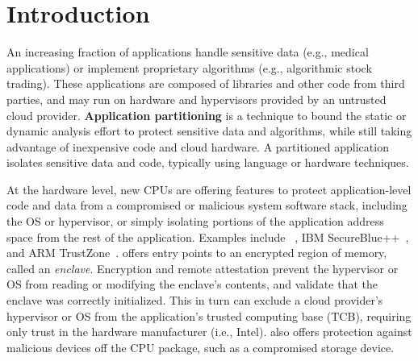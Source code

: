 \section{Introduction}
\label{sec:intro}


An increasing fraction of applications handle sensitive data (e.g., medical applications)
or implement proprietary algorithms (e.g., algorithmic stock trading).
These applications are composed of 
libraries and other code from third parties, and may run on 
hardware and hypervisors provided by an untrusted cloud provider.
{\bf Application partitioning} is a technique to 
bound the 
static or dynamic analysis effort to protect sensitive data and algorithms,
while still taking advantage of inexpensive code and cloud hardware.
A partitioned application isolates sensitive data and code, typically using
language or hardware techniques.


At the hardware level, 
new CPUs are offering features to protect application-level code and data
from a  compromised or malicious system software stack,
including the OS or hypervisor, or simply isolating portions of the 
application address space from the rest of the application.
Examples include \intel{} \sgx{}~\citep{sgx-manual}, 
IBM SecureBlue++~\citep{secureblue++}, and ARM TrustZone~\citep{trustzone}.
\sgx{} offers %
entry points to an encrypted region of memory, called an {\em enclave}.
Encryption and remote attestation 
prevent the hypervisor or OS from reading or modifying the enclave's contents,
and validate that the enclave was correctly initialized.
This in turn
can exclude 
a cloud provider's hypervisor or OS from the application's trusted computing base (TCB),
requiring only trust in the hardware manufacturer (i.e., Intel).
\sgx{} also offers protection against malicious devices off the CPU package,
such as a compromised storage device.

